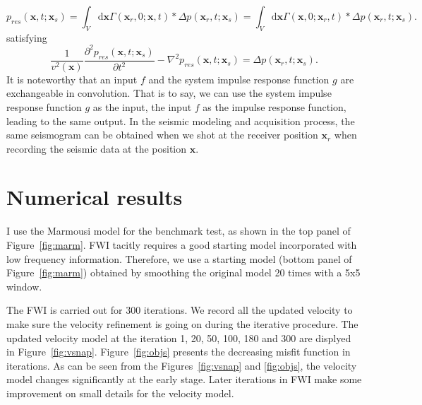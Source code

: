\begin{equation} 
p_{res}(\textbf{x},t;\textbf{x}_s)
=\int_V \mathrm{d}\textbf{x}\Gamma(\textbf{x}_r,0;\textbf{x},t)*\Delta p(\textbf{x}_r,t;\textbf{x}_s)
=\int_V \mathrm{d}\textbf{x}\Gamma(\textbf{x},0;\textbf{x}_r,t)*\Delta p(\textbf{x}_r,t;\textbf{x}_s).
\end{equation}
satisfying
\begin{equation}
\frac{1}{v^2(\textbf{x})}\frac{\partial^2 p_{res}(\textbf{x},t;\textbf{x}_s)}{\partial t^2}-\nabla^2 p_{res}(\textbf{x},t;\textbf{x}_s)=\Delta p(\textbf{x}_r,t;\textbf{x}_s).
\end{equation}
It is noteworthy that an input $f$ and the system impulse response function  $g$ are exchangeable in convolution. That is to say, we can use the system impulse response function $g$ as the input, the input $f$ as the impulse response function, leading to the same output. In the seismic modeling and acquisition process, the same seismogram can be obtained when we shot at the receiver position $\textbf{x}_r$ when recording the seismic data at the position $\textbf{x}$.

\section{Numerical results}

I use the Marmousi model for the benchmark test, as shown in the top panel of Figure~\ref{fig:marm}.
FWI tacitly requires a good starting model incorporated with low frequency information. Therefore, we use a starting model (bottom panel of Figure~\ref{fig:marm}) obtained by smoothing the original model 20 times with a 5x5 window.

The FWI is carried out for 300 iterations. We record all the updated velocity to make sure the velocity refinement is going on during the iterative procedure. The updated velocity model at the iteration 1, 20, 50, 100, 180 and 300 are displyed in Figure~\ref{fig:vsnap}. Figure~\ref{fig:objs} presents the decreasing misfit function in iterations. As can be seen from the Figures~\ref{fig:vsnap} and \ref{fig:objs}, the velocity model changes significantly at the early stage. Later iterations in FWI make some improvement on small details for the velocity model.




